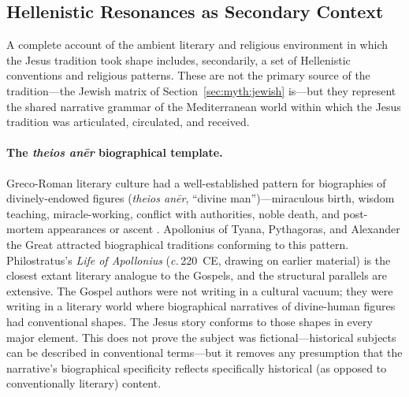 \documentclass[12pt,oneside]{article}
\newcommand{\circa}{\textit{c.}\,}
\begin{document}
\subsection{Hellenistic Resonances as Secondary Context}
\label{sec:myth:hellenistic}

A complete account of the ambient literary and religious environment in
which the Jesus tradition took shape includes, secondarily, a set of
Hellenistic conventions and religious patterns.  These are not the
primary source of the tradition---the Jewish matrix of
Section~\ref{sec:myth:jewish} is---but they represent the shared
narrative grammar of the Mediterranean world within which the Jesus
tradition was articulated, circulated, and received.

\paragraph{The \textit{theios an\=er} biographical template.}
Greco-Roman literary culture had a well-established pattern for
biographies of divinely-endowed figures (\textit{theios an\=er},
\enquote{divine man})---miraculous birth, wisdom teaching,
miracle-working, conflict with authorities, noble death, and
post-mortem appearances or ascent \citep{Bieler1935,Tiede1972}.
Apollonius of Tyana, Pythagoras, and Alexander the Great attracted
biographical traditions conforming to this pattern.  Philostratus's
\textit{Life of Apollonius} (\circa 220~CE, drawing on earlier
material) is the closest extant literary analogue to the Gospels, and
the structural parallels are extensive.  The Gospel authors were not
writing in a cultural vacuum; they were writing in a literary world
where biographical narratives of divine-human figures had conventional
shapes.  The Jesus story conforms to those shapes in every major
element.  This does not prove the subject was fictional---historical
subjects can be described in conventional terms---but it removes any
presumption that the narrative's biographical specificity reflects
specifically historical (as opposed to conventionally literary)
content.
\end{document}
